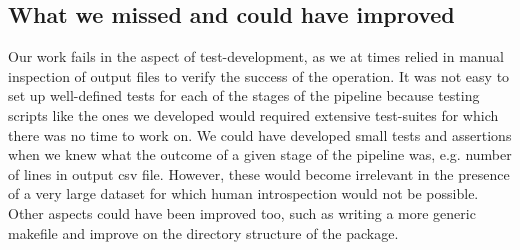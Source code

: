 \documentclass{article}
\begin{document}
\subsection*{What we missed and could have improved}
Our work fails in the aspect of test-development, as we at times relied in manual inspection of output files to verify the success of the operation. It was not easy to set up well-defined tests for each of the stages of the pipeline because testing scripts like the ones we developed would required extensive test-suites for which there was no time to work on. We could have developed small tests and assertions when we knew what the outcome of a given stage of the pipeline was, e.g. number of lines in output csv file. However, these would become irrelevant in the presence of a very large dataset for which human introspection would not be possible.\\

Other aspects could have been improved too, such as writing a more generic makefile and improve on the directory structure of the package.
\end{document}

